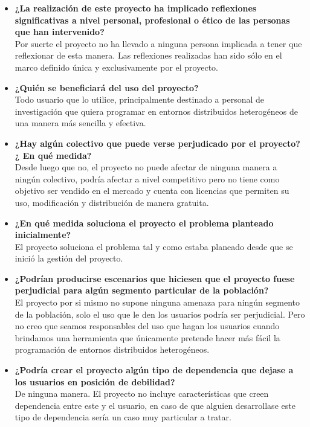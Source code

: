 \begin{itemize}
	\item \textbf{¿La realización de este proyecto ha implicado reflexiones significativas a nivel personal, profesional o ético de las personas que han intervenido?} \\
	
	Por suerte el proyecto no ha llevado a ninguna persona implicada a tener que reflexionar de esta manera. Las reflexiones realizadas han sido sólo en el marco definido única y exclusivamente por el proyecto.
	
	\item \textbf{¿Quién se beneficiará del uso del proyecto?} \\
	
	Todo usuario que lo utilice, principalmente destinado a personal de investigación que quiera programar en entornos distribuidos heterogéneos de una manera más sencilla y efectiva.
	
	\item \textbf{¿Hay algún colectivo que puede verse perjudicado por el proyecto? ¿ En qué medida?} \\
	
	Desde luego que no, el proyecto no puede afectar de ninguna manera a ningún colectivo, podría afectar a nivel competitivo pero no tiene como objetivo ser vendido en el mercado y cuenta con licencias que permiten su uso, modificación y distribución de manera gratuita.
	
	\item \textbf{¿En qué medida soluciona el proyecto el problema planteado inicialmente?} \\
	
	El proyecto soluciona el problema tal y como estaba planeado desde que se inició la gestión del proyecto.
	
	\item \textbf{¿Podrían producirse escenarios que hiciesen que el proyecto fuese perjudicial para algún
		segmento particular de la población?} \\
	
	El proyecto por si mismo no supone ninguna amenaza para ningún segmento de la población, solo el uso que le den los usuarios podría ser perjudicial. Pero no creo que seamos responsables del uso que hagan los usuarios cuando brindamos una herramienta que únicamente pretende hacer más fácil la programación de entornos distribuidos heterogéneos.
	
	\item \textbf{¿Podría crear el proyecto algún tipo de dependencia que dejase a los usuarios en posición
		de debilidad?} \\
	
	De ninguna manera. El proyecto no incluye características que creen dependencia entre este y el usuario, en caso de que alguien desarrollase este tipo de dependencia sería un caso muy particular a tratar.
	
\end{itemize}